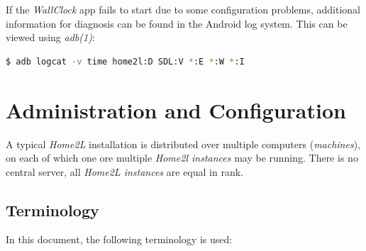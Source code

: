 \documentclass[12pt,english,parskip=half,headheight=19pt]{scrreprt}
\begin{document}
If the \textit{WallClock} app fails to start due to some configuration problems,
additional information for diagnosis can be found in the Android log system.
This can be viewed using \textit{adb(1)}:
\begin{lstlisting}[language=bash]
  $ adb logcat -v time home2l:D SDL:V *:E *:W *:I
\end{lstlisting}




\chapter{Administration and Configuration}
\label{ch:managing}


A typical \textit{Home2L} installation is distributed over multiple
computers (\textit{machines}), on each of which one ore multiple \textit{Home2l instances}
may be running. There is no central server, all \textit{Home2L instances} are equal in rank.





\section{Terminology}
\label{sec:managing-terminology}


In this document, the following terminology is used:
\end{document}
